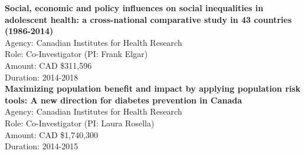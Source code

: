 \documentclass[
  letterpaper,
  DIV=11,
  numbers=noendperiod]{scrartcl}
\begin{document}
\textbf{Social, economic and policy influences on social inequalities in
adolescent health: a cross-national comparative study in 43 countries
(1986-2014)}\\
\hspace*{0.333em}\hspace*{0.333em}\hspace*{0.333em}\hspace*{0.333em}Agency:
Canadian Institutes for Health Research\\
\hspace*{0.333em}\hspace*{0.333em}\hspace*{0.333em}\hspace*{0.333em}Role:
Co-Investigator (PI: Frank Elgar)\\
\hspace*{0.333em}\hspace*{0.333em}\hspace*{0.333em}\hspace*{0.333em}Amount:
CAD \$311,596\\
\hspace*{0.333em}\hspace*{0.333em}\hspace*{0.333em}\hspace*{0.333em}Duration:
2014-2018\\

\textbf{Maximizing population benefit and impact by applying population
risk tools: A new direction for diabetes prevention in Canada}\\
\hspace*{0.333em}\hspace*{0.333em}\hspace*{0.333em}\hspace*{0.333em}Agency:
Canadian Institutes for Health Research\\
\hspace*{0.333em}\hspace*{0.333em}\hspace*{0.333em}\hspace*{0.333em}Role:
Co-Investigator (PI: Laura Rosella)\\
\hspace*{0.333em}\hspace*{0.333em}\hspace*{0.333em}\hspace*{0.333em}Amount:
CAD \$1,740,300\\
\hspace*{0.333em}\hspace*{0.333em}\hspace*{0.333em}\hspace*{0.333em}Duration:
2014-2015\\
\end{document}
